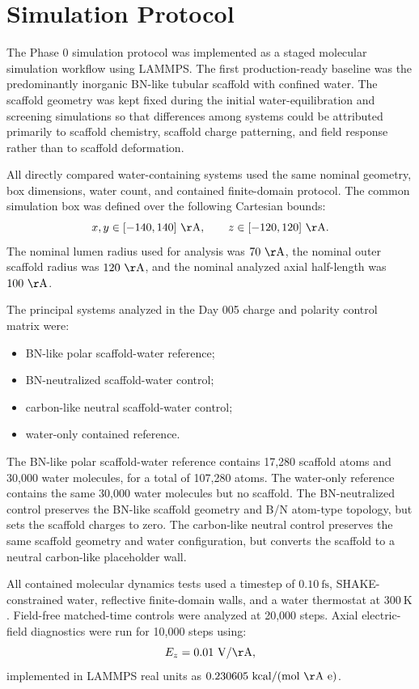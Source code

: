 \documentclass[11pt,letterpaper]{article}
\begin{document}
\section{Simulation Protocol}

The Phase 0 simulation protocol was implemented as a staged molecular simulation workflow using LAMMPS. The first production-ready baseline was the predominantly inorganic BN-like tubular scaffold with confined water. The scaffold geometry was kept fixed during the initial water-equilibration and screening simulations so that differences among systems could be attributed primarily to scaffold chemistry, scaffold charge patterning, and field response rather than to scaffold deformation.

All directly compared water-containing systems used the same nominal geometry, box dimensions, water count, and contained finite-domain protocol. The common simulation box was defined over the following Cartesian bounds:
\[
x,y \in [-140,140]~\mathrm{\AA}, \qquad z \in [-120,120]~\mathrm{\AA}.
\]
The nominal lumen radius used for analysis was \(70~\mathrm{\AA}\), the nominal outer scaffold radius was \(120~\mathrm{\AA}\), and the nominal analyzed axial half-length was \(100~\mathrm{\AA}\).

The principal systems analyzed in the Day 005 charge and polarity control matrix were:

\begin{itemize}
    \item BN-like polar scaffold-water reference;
    \item BN-neutralized scaffold-water control;
    \item carbon-like neutral scaffold-water control;
    \item water-only contained reference.
\end{itemize}

The BN-like polar scaffold-water reference contains 17,280 scaffold atoms and 30,000 water molecules, for a total of 107,280 atoms. The water-only reference contains the same 30,000 water molecules but no scaffold. The BN-neutralized control preserves the BN-like scaffold geometry and B/N atom-type topology, but sets the scaffold charges to zero. The carbon-like neutral control preserves the same scaffold geometry and water configuration, but converts the scaffold to a neutral carbon-like placeholder wall.

All contained molecular dynamics tests used a timestep of \(0.10~\mathrm{fs}\), SHAKE-constrained water, reflective finite-domain walls, and a water thermostat at \(300~\mathrm{K}\). Field-free matched-time controls were analyzed at 20,000 steps. Axial electric-field diagnostics were run for 10,000 steps using:
\[
E_z = 0.01~\mathrm{V/\AA},
\]
implemented in LAMMPS real units as \(0.230605~\mathrm{kcal/(mol~\AA~e)}\).
\end{document}
